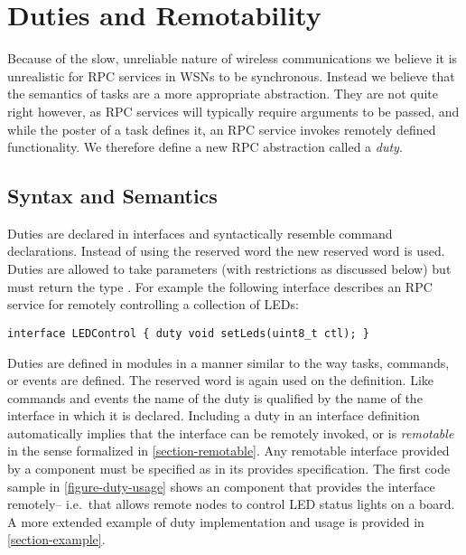 \section{Duties and Remotability}
\label{section-duties}

Because of the slow, unreliable nature of wireless communications we
believe it is unrealistic for RPC services in WSNs to be synchronous.
Instead we believe that the semantics of tasks are a more appropriate
abstraction. They are not quite right however, as RPC services will
typically require arguments to be passed, and while the poster of a task
defines it, an RPC service invokes remotely defined functionality. We
therefore define a new RPC abstraction called a \emph{duty}.

\subsection{Syntax and Semantics}
\label{section-duties-syntax}

Duties are declared in interfaces and syntactically resemble command
declarations. Instead of using the reserved word  the new
reserved word  is used. Duties are allowed to take parameters
(with restrictions as discussed below) but must return the type
. For example the following interface describes an RPC
service for remotely controlling a collection of LEDs:

\begin{lrbox}{\savebigbox}
\begin{minipage}{4.2in}
\vspace{0.8em}
\begin{Verbatim}
interface LEDControl { duty void setLeds(uint8_t ctl); }
\end{Verbatim}
\vspace{0.3em}
\end{minipage}
\end{lrbox}
\centerline{\usebox{\savebigbox}}

Duties are defined in modules in a manner similar to the way tasks,
commands, or events are defined. The reserved word  is
again used on the definition. Like commands and events the name of the
duty is qualified by the name of the interface in which it is
declared.  Including a duty in an interface definition automatically
implies that the interface can be remotely invoked, or is
\emph{remotable} in the sense formalized in
\autoref{section-remotable}. Any remotable interface provided by a
component must be specified as  in its provides
specification.  The first code sample in \autoref{figure-duty-usage}
shows an  component that provides the
 interface remotely-- i.e.~that allows remote nodes
to control LED status lights on a board.  A more extended example of
duty implementation and usage is provided in
\autoref{section-example}.


